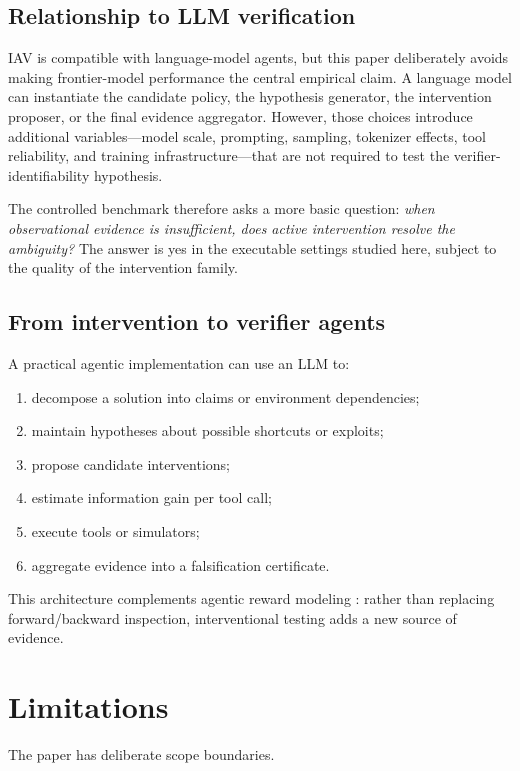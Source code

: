 \documentclass[10pt]{article}
\begin{document}
\subsection{Relationship to LLM verification}

IAV is compatible with language-model agents, but this paper deliberately avoids making frontier-model performance the central empirical claim. A language model can instantiate the candidate policy, the hypothesis generator, the intervention proposer, or the final evidence aggregator. However, those choices introduce additional variables---model scale, prompting, sampling, tokenizer effects, tool reliability, and training infrastructure---that are not required to test the verifier-identifiability hypothesis.

The controlled benchmark therefore asks a more basic question: \emph{when observational evidence is insufficient, does active intervention resolve the ambiguity?} The answer is yes in the executable settings studied here, subject to the quality of the intervention family.

\subsection{From intervention to verifier agents}

A practical agentic implementation can use an LLM to:
\begin{enumerate}[leftmargin=1.3em]
    \item decompose a solution into claims or environment dependencies;
    \item maintain hypotheses about possible shortcuts or exploits;
    \item propose candidate interventions;
    \item estimate information gain per tool call;
    \item execute tools or simulators;
    \item aggregate evidence into a falsification certificate.
\end{enumerate}
This architecture complements agentic reward modeling \citep{zhang2026agentv}: rather than replacing forward/backward inspection, interventional testing adds a new source of evidence.

\section{Limitations}

The paper has deliberate scope boundaries.
\end{document}
